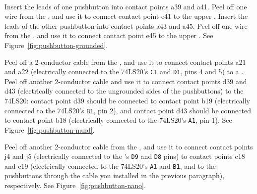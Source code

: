 \disconnect\

Insert the leads of one pushbutton into contact points a39 and a41.
Peel off one wire from the \rainbow, and use it to connect contact point e41 to the upper \ground.
Insert the leads of the other pushbutton into contact points a43 and a45.
Peel off one wire from the \rainbow, and use it to connect contact point e45 to the upper \ground.
See Figure~\ref{fig:pushbutton-grounded}.

Peel off a 2-conductor cable from the \rainbow, and use it to connect contact points a21 and a22 (electrically connected to the 74LS20's \texttt{C1} and \texttt{D1}, pins 4 and 5) to a \power.
Peel off another 2-conductor cable and use it to connect contact points d39 and d43 (electrically connected to the ungrounded sides of the pushbuttons) to the 74LS20: contact point d39 should be connected to contact point b19 (electrically connected to the 74LS20's \texttt{B1}, pin 2), and contact point d43 should be connected to contact point b18 (electrically connected to the 74LS20's \texttt{A1}, pin 1).
See Figure~\ref{fig:pushbutton-nand}.

Peel off another 2-conductor cable from the \rainbow, and use it to connect contact points j4 and j5 (electrically connected to the \developmentboard's \texttt{D9} and \texttt{D8} pins) to contact points c18 and c19 (electrically connected to the 74LS20's \texttt{A1} and \texttt{B1}, and to the pushbuttons through the cable you installed in the previous paragraph), respectively.
See Figure~\ref{fig:pushbutton-nano}.

